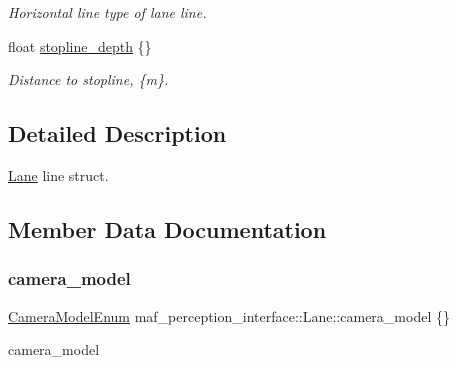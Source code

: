 \begin{DoxyCompactItemize}
\begin{DoxyCompactList}\small\item\em Horizontal line type of lane line. \end{DoxyCompactList}\item 
float \hyperlink{structmaf__perception__interface_1_1Lane_a2a3a12e6ced10d0ff67ce4ff62ef5bd8}{stopline\+\_\+depth} \{\}
\begin{DoxyCompactList}\small\item\em Distance to stopline, \{m\}. \end{DoxyCompactList}\end{DoxyCompactItemize}


\subsection{Detailed Description}
\hyperlink{structmaf__perception__interface_1_1Lane}{Lane} line struct. 

\subsection{Member Data Documentation}
\mbox{\label{structmaf__perception__interface_1_1Lane_a7f21fa4eb14ad430f6a8ab607a0b2e23}} 
\subsubsection{\texorpdfstring{camera\+\_\+model}{camera\_model}}
{\footnotesize\ttfamily \hyperlink{structmaf__perception__interface_1_1CameraModelEnum}{Camera\+Model\+Enum} maf\+\_\+perception\+\_\+interface\+::\+Lane\+::camera\+\_\+model \{\}}



camera\+\_\+model 

\mbox{\label{structmaf__perception__interface_1_1Lane_a46d69d28b02fc58192d3065975ca720a}} 

